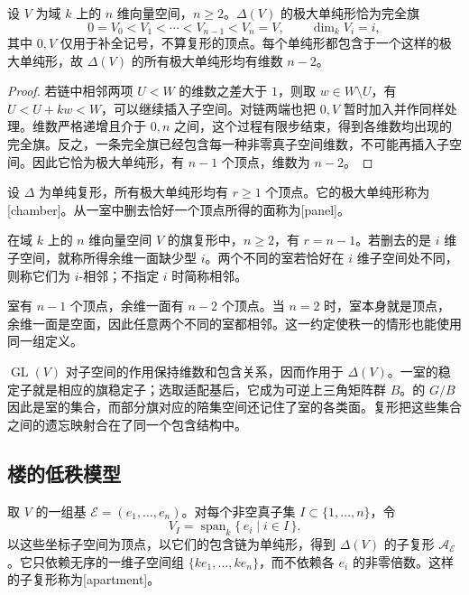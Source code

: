\begin{proposition}\label{b5:prop:F-chambers-flags}
	设 \(V\) 为域 \(k\) 上的 \(n\) 维向量空间，\(n\ge2\)。\(\Delta(V)\) 的极大单纯形恰为完全旗
	\[
		0=V_0<V_1<\cdots<V_{n-1}<V_n=V,
		\qquad \dim_kV_i=i,
	\]
	其中 \(0,V\) 仅用于补全记号，不算复形的顶点。每个单纯形都包含于一个这样的极大单纯形，故 \(\Delta(V)\) 的所有极大单纯形均有维数 \(n-2\)。
\end{proposition}

\begin{proof}
	若链中相邻两项 \(U<W\) 的维数之差大于 \(1\)，则取 \(w\in W\setminus U\)，有 \(U<U+kw<W\)，可以继续插入子空间。对链两端也把 \(0,V\) 暂时加入并作同样处理。维数严格递增且介于 \(0,n\) 之间，这个过程有限步结束，得到各维数均出现的完全旗。反之，一条完全旗已经包含每一种非零真子空间维数，不可能再插入子空间。因此它恰为极大单纯形，有 \(n-1\) 个顶点，维数为 \(n-2\)。
\end{proof}

\begin{definition}\label{b5:def:F-chamber-panel}
	设 \(\Delta\) 为单纯复形，所有极大单纯形均有 \(r\ge1\) 个顶点。它的极大单纯形称为[chamber]。从一室中删去恰好一个顶点所得的面称为[panel]。

	在域 \(k\) 上的 \(n\) 维向量空间 \(V\) 的旗复形中，\(n\ge2\)，有 \(r=n-1\)。若删去的是 \(i\) 维子空间，就称所得余维一面缺少型 \(i\)。两个不同的室若恰好在 \(i\) 维子空间处不同，则称它们为 \(i\)-相邻；不指定 \(i\) 时简称相邻。
\end{definition}

室有 \(n-1\) 个顶点，余维一面有 \(n-2\) 个顶点。当 \(n=2\) 时，室本身就是顶点，余维一面是空面，因此任意两个不同的室都相邻。这一约定使秩一的情形也能使用同一组定义。

\ProseParagraphBreak

\(\operatorname{GL}(V)\) 对子空间的作用保持维数和包含关系，因而作用于 \(\Delta(V)\)。一室的稳定子就是相应的旗稳定子；选取适配基后，它成为可逆上三角矩阵群 \(B\)。的 \(G/B\) 因此是室的集合，而部分旗对应的陪集空间还记住了室的各类面。复形把这些集合之间的遗忘映射合在了同一个包含结构中。

\subsection{楼的低秩模型}
\label{b5:subsec:F03:02}

取 \(V\) 的一组基 \(\mathcal E=(e_1,\ldots,e_n)\)。对每个非空真子集 \(I\subset\{1,\ldots,n\}\)，令
\[
	V_I=\operatorname{span}_k\{\,e_i\mid i\in I\,\}.
\]
以这些坐标子空间为顶点，以它们的包含链为单纯形，得到 \(\Delta(V)\) 的子复形 \(\mathcal A_{\mathcal E}\)。它只依赖无序的一维子空间组 \(\{ke_1,\ldots,ke_n\}\)，而不依赖各 \(e_i\) 的非零倍数。这样的子复形称为[apartment]。

